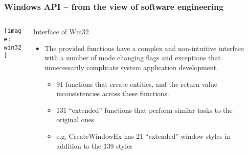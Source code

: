 \begin{frame}[plain]
	\frametitle{Windows API -- from the view of software engineering}
	
	
	
	\begin{columns}
		
		\begin{column}{.4\textwidth}
			
			\texttt{[image: win32]}
			
		\end{column}
		
		\begin{column}{.6\textwidth}
			
			Interface of Win32
			
			\begin{itemize}
				\item The provided functions have a complex and non-intuitive
				interface with a number of mode changing flags and exceptions that unnecessarily complicate system application development. 
				\begin{itemize}	
					\item 91 functions that create entities, and the return value inconsistencies across these functions.
					
					\item 131 “extended” functions that perform similar tasks to the original ones. 
					\item e.g. CreateWindowEx has 21 “extended” window
					styles in addition to the 139 styles 
			\end{itemize}
		\end{itemize}
		\end{column}		
	\end{columns}
	
	
\end{frame}


